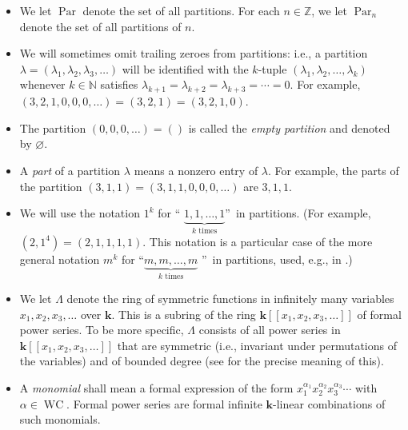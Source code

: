 \documentclass[numbers=enddot,12pt,final,onecolumn,notitlepage]{scrartcl}%
\theoremstyle{definition}
\begin{document}
\begin{itemize}
\item We let $\operatorname*{Par}$ denote the set of all partitions. For each
$n\in\mathbb{Z}$, we let $\operatorname*{Par}\nolimits_{n}$ denote the set of
all partitions of $n$.

\item We will sometimes omit trailing zeroes from partitions: i.e., a
partition $\lambda=\left(  \lambda_{1},\lambda_{2},\lambda_{3},\ldots\right)
$ will be identified with the $k$-tuple $\left(  \lambda_{1},\lambda
_{2},\ldots,\lambda_{k}\right)  $ whenever $k\in\mathbb{N}$ satisfies
$\lambda_{k+1}=\lambda_{k+2}=\lambda_{k+3}=\cdots=0$. For example, $\left(
3,2,1,0,0,0,\ldots\right)  =\left(  3,2,1\right)  =\left(  3,2,1,0\right)  $.

\item The partition $\left(  0,0,0,\ldots\right)  =\left(  {}\right)  $ is
called the \emph{empty partition} and denoted by $\varnothing$.

\item A \emph{part} of a partition $\lambda$ means a nonzero entry of
$\lambda$. For example, the parts of the partition $\left(  3,1,1\right)
=\left(  3,1,1,0,0,0,\ldots\right)  $ are $3,1,1$.

\item We will use the notation $1^{k}$ for \textquotedblleft%
$\underbrace{1,1,\ldots,1}_{k\text{ times}}$\textquotedblright\ in partitions.
(For example, $\left(  2,1^{4}\right)  =\left(  2,1,1,1,1\right)  $. This
notation is a particular case of the more general notation $m^{k}$ for
\textquotedblleft$\underbrace{m,m,\ldots,m}_{k\text{ times}}$%
\textquotedblright\ in partitions, used, e.g., in \cite[Definition
2.2.1]{GriRei}.)

\item We let $\Lambda$ denote the ring of symmetric functions in infinitely
many variables $x_{1},x_{2},x_{3},\ldots$ over $\mathbf{k}$. This is a subring
of the ring $\mathbf{k}\left[  \left[  x_{1},x_{2},x_{3},\ldots\right]
\right]  $ of formal power series. To be more specific, $\Lambda$ consists of
all power series in $\mathbf{k}\left[  \left[  x_{1},x_{2},x_{3}%
,\ldots\right]  \right]  $ that are symmetric (i.e., invariant under
permutations of the variables) and of bounded degree (see \cite[\S 2.1]%
{GriRei} for the precise meaning of this).

\item A \emph{monomial} shall mean a formal expression of the form
$x_{1}^{\alpha_{1}}x_{2}^{\alpha_{2}}x_{3}^{\alpha_{3}}\cdots$ with $\alpha
\in\operatorname*{WC}$. Formal power series are formal infinite $\mathbf{k}%
$-linear combinations of such monomials.


\end{itemize}
\end{document}
